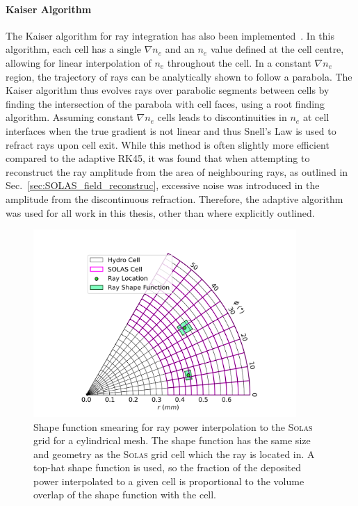 \paragraph*{Kaiser Algorithm}
The Kaiser algorithm for ray integration has also been implemented~\cite{kaiser_laser_2000}.
In this algorithm, each cell has a single $\nabla n_e$ and an $n_e$ value defined at the cell centre, allowing for linear interpolation of $n_e$ throughout the cell.
In a constant $\nabla n_e$ region, the trajectory of rays can be analytically shown to follow a parabola.
The Kaiser algorithm thus evolves rays over parabolic segments between cells by finding the intersection of the parabola with cell faces, using a root finding algorithm.
Assuming constant $\nabla n_e$ cells leads to discontinuities in $n_e$ at cell interfaces when the true gradient is not linear and thus Snell's Law is used to refract rays upon cell exit.
While this method is often slightly more efficient compared to the adaptive RK45, it was found that when attempting to reconstruct the ray amplitude from the area of neighbouring rays, as outlined in Sec.~\ref{sec:SOLAS_field_reconstruc}, excessive noise was introduced in the amplitude from the discontinuous refraction.
Therefore, the adaptive algorithm was used for all work in this thesis, other than where explicitly outlined.

\begin{figure}[t!]
    \includegraphics[width=10.0cm]{Numerics/Images/SOLAS_ray_shape_functions.png}
    \centering
    \caption{Shape function smearing for ray power interpolation to the \textsc{Solas} grid for a cylindrical mesh.
    The shape function has the same size and geometry as the \textsc{Solas} grid cell which the ray is located in.
    A top-hat shape function is used, so the fraction of the deposited power interpolated to a given cell is proportional to the volume overlap of the shape function with the cell.}%
    \label{fig:SOLAS_ray_shapefunction}
\end{figure}

